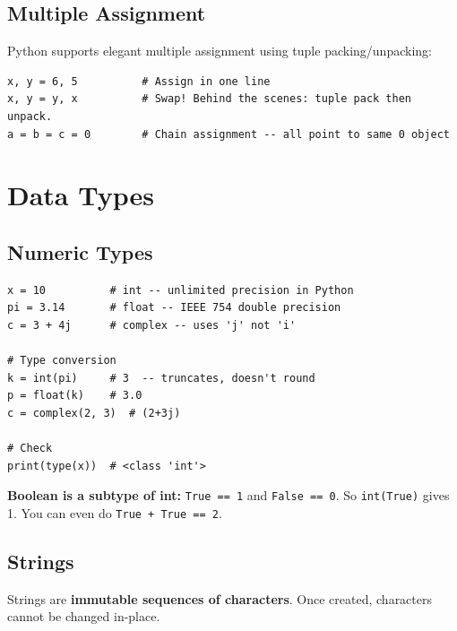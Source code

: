 \documentclass[12pt,a4paper]{article}
\newcommand{\code}[1]{\texttt{\small\color{pyblue}#1}}
\begin{document}
\subsection{Multiple Assignment}

Python supports elegant multiple assignment using tuple packing/unpacking:

\begin{lstlisting}
x, y = 6, 5          # Assign in one line
x, y = y, x          # Swap! Behind the scenes: tuple pack then unpack.
a = b = c = 0        # Chain assignment -- all point to same 0 object
\end{lstlisting}

\section{Data Types}

\subsection{Numeric Types}

\begin{lstlisting}
x = 10          # int -- unlimited precision in Python
pi = 3.14       # float -- IEEE 754 double precision
c = 3 + 4j      # complex -- uses 'j' not 'i'

# Type conversion
k = int(pi)     # 3  -- truncates, doesn't round
p = float(k)    # 3.0
c = complex(2, 3)  # (2+3j)

# Check
print(type(x))  # <class 'int'>
\end{lstlisting}

\begin{notebox}
\textbf{Boolean is a subtype of int:}
\code{True == 1} and \code{False == 0}. So \code{int(True)} gives 1. You can even do \code{True + True == 2}.
\end{notebox}

\subsection{Strings}

Strings are \textbf{immutable sequences of characters}. Once created, characters cannot be changed in-place.
\end{document}
